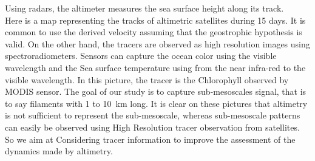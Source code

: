 \documentclass[compress,slidescentered,notes=show]{beamer}
\begin{document}
\begin{frame}
{Using radars, the altimeter measures the sea surface height along its track. \\
Here is a map representing the tracks of altimetric satellites during 15 days.
It is common to use the derived velocity assuming that the geostrophic hypothesis is valid.
On the other hand, the tracers are observed as high resolution images using spectroradiometers.
Sensors can capture the ocean color using the visible wavelength and the Sea surface temperature using from the near infra-red to the visible wavelength. 
In this picture, the tracer is the Chlorophyll observed by MODIS sensor. 
The goal of our study is to capture sub-mesoscales signal, that is to say filaments with 1 to 10~km long. 
It is clear on these pictures that altimetry is not sufficient to represent the sub-mesoscale, whereas sub-mesoscale patterns can easily be observed using High Resolution tracer observation from satellites. 
So we aim at Considering tracer information to improve the assessment of the dynamics made by altimetry. 
}
\end{frame}
\end{document}
